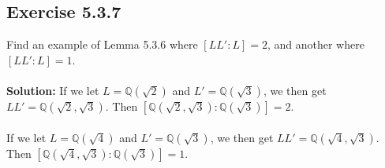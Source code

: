\documentclass{article}
\begin{document}
\subsection*{Exercise 5.3.7}
Find an example of Lemma 5.3.6 where $[LL':L]=2$, and another where $[LL':L]=1$.
\\\\
\textbf{Solution:}
If we let $L = \mathbb{Q}(\sqrt2)$ and $L' = \mathbb{Q}(\sqrt3)$, we then get $LL' = \mathbb{Q}(\sqrt2,\sqrt3)$.
Then $[\mathbb{Q}(\sqrt2,\sqrt3):\mathbb{Q}(\sqrt3)] = 2$.\\\\
If we let $L = \mathbb{Q}(\sqrt4)$ and $L' = \mathbb{Q}(\sqrt3)$, we then get $LL' = \mathbb{Q}(\sqrt4,\sqrt3)$.
Then $[\mathbb{Q}(\sqrt4,\sqrt3):\mathbb{Q}(\sqrt3)] = 1$.
\end{document}
